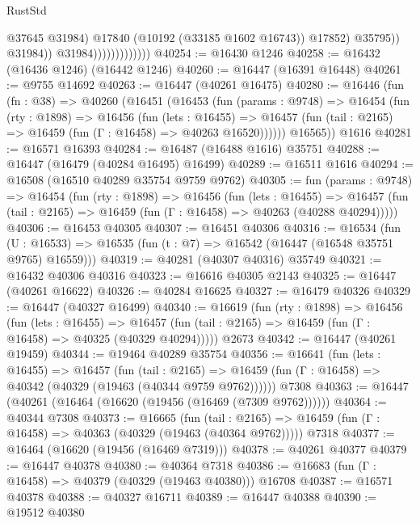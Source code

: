 \begin{lexlean}{RustStd}
\begin{coremodule}
                                          @37645
                                          @31984)
                                        @17840
                                        (@10192 (@33185 @1602 @16743))
                                        @17852)
                                      @35795))
                                  @31984))
                              @31984)))))))))))))
@40254 := @16430 @1246
@40258 := @16432 (@16436 @1246) (@16442 @1246)
@40260 := @16447 (@16391 @16448)
@40261 := @9755 @14692
@40263 := @16447 (@40261 @16475)
@40280 := @16446
    (fun (fn : @38) =>
    @40260
      (@16451
        (@16453
          (fun (params : @9748) =>
          @16454
            (fun (rty : @1898) =>
            @16456
              (fun (lets : @16455) =>
              @16457 (fun (tail : @2165) => @16459 (fun (Γ : @16458) => @40263 @16520))))))
        @16565))
    @1616
@40281 := @16571 @16393
@40284 := @16487 (@16488 @1616) @35751
@40288 := @16447 (@16479 (@40284 @16495) @16499)
@40289 := @16511 @1616
@40294 := @16508 (@16510 @40289 @35754 @9759 @9762)
@40305 := fun (params : @9748) =>
  @16454
    (fun (rty : @1898) =>
    @16456
      (fun (lets : @16455) =>
      @16457 (fun (tail : @2165) => @16459 (fun (Γ : @16458) => @40263 (@40288 @40294)))))
@40306 := @16453 @40305
@40307 := @16451 @40306
@40316 := @16534
    (fun (U : @16533) => @16535 (fun (t : @7) => @16542 (@16447 (@16548 @35751 @9765) @16559)))
@40319 := @40281 (@40307 @40316) @35749
@40321 := @16432 @40306 @40316
@40323 := @16616 @40305 @2143
@40325 := @16447 (@40261 @16622)
@40326 := @40284 @16625
@40327 := @16479 @40326
@40329 := @16447 (@40327 @16499)
@40340 := @16619
    (fun (rty : @1898) =>
    @16456
      (fun (lets : @16455) =>
      @16457 (fun (tail : @2165) => @16459 (fun (Γ : @16458) => @40325 (@40329 @40294)))))
    @2673
@40342 := @16447 (@40261 @19459)
@40344 := @19464 @40289 @35754
@40356 := @16641
    (fun (lets : @16455) =>
    @16457
      (fun (tail : @2165) =>
      @16459 (fun (Γ : @16458) => @40342 (@40329 (@19463 (@40344 @9759 @9762))))))
    @7308
@40363 := @16447 (@40261 (@16464 (@16620 (@19456 (@16469 (@7309 @9762))))))
@40364 := @40344 @7308
@40373 := @16665
    (fun (tail : @2165) => @16459 (fun (Γ : @16458) => @40363 (@40329 (@19463 (@40364 @9762)))))
    @7318
@40377 := @16464 (@16620 (@19456 (@16469 @7319)))
@40378 := @40261 @40377
@40379 := @16447 @40378
@40380 := @40364 @7318
@40386 := @16683 (fun (Γ : @16458) => @40379 (@40329 (@19463 @40380))) @16708
@40387 := @16571 @40378
@40388 := @40327 @16711
@40389 := @16447 @40388
@40390 := @19512 @40380

\end{coremodule}
\end{lexlean}
